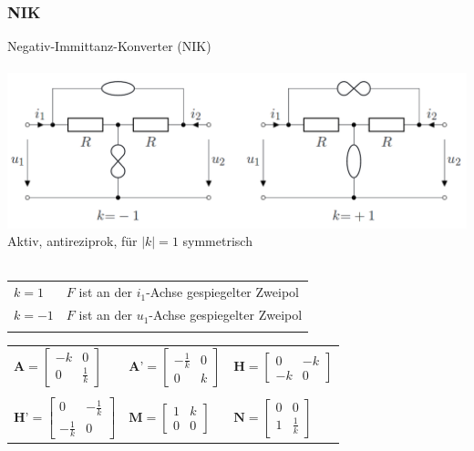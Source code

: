 \documentclass[a4paper,twocolumn,10pt]{article}
\begin{document}
\subsubsection*{NIK}
Negativ-Immittanz-Konverter (NIK)\\\\
\includegraphics[width=1\linewidth, keepaspectratio]{img/NIK.png}
Aktiv, antireziprok, für $|k|=1$ symmetrisch\\\\
\begin{tabular}{ll}
$k=1$ & $F$ ist an der $i_1$-Achse gespiegelter Zweipol\\
$k=-1$ & $F$ ist an der $u_1$-Achse gespiegelter Zweipol\\\\
\end{tabular}
\begin{tabular}{lll}
$\textbf{A}=\begin{bmatrix}-k & 0\\ 0 & \frac{1}{k}\end{bmatrix}$ & $\textbf{A'}=\begin{bmatrix}-\frac{1}{k} & 0\\ 0 & k\end{bmatrix}$ & $\textbf{H}=\begin{bmatrix}0 & -k\\ -k & 0\end{bmatrix}$\\\\
$\textbf{H'}=\begin{bmatrix}0 & -\frac{1}{k}\\ -\frac{1}{k} & 0\end{bmatrix}$ & $\textbf{M}=\begin{bmatrix}1 & k\\ 0 & 0\end{bmatrix}$ & $\textbf{N}=\begin{bmatrix}0 & 0\\ 1 & \frac{1}{k}\end{bmatrix}$
\end{tabular}
\end{document}

